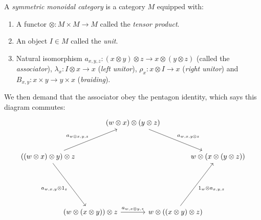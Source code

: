 \documentclass[TFM.tex]{subfiles}
\begin{document}
\begin{defi}
A \emph{symmetric monoidal category} is a category $M$ equipped with:
\begin{enumerate}[(1)]
\item A functor $\otimes: M\times M\to M$ called the \emph{tensor product}.
\item An object $I\in M$ called the \emph{unit}.
\item Natural isomorphism $a_{x,y,z} : (x \otimes y) \otimes z \to x \otimes (y \otimes z)$ (called the \emph{associator}), $\lambda_x : I \otimes x \to x$ (\emph{left unitor}), $\rho_x : x \otimes I \to x$ (\emph{right unitor}) and $B_{x,y}: x\times y\to y\times x$ (\emph{braiding}).
\end{enumerate}

We then demand that the associator obey the pentagon identity, which says this diagram commutes:
\[
\begin{tikzcd}[column sep=-25, row sep=30]
                                                                                                            &                                                                     & (w\otimes x)\otimes (y\otimes z) \arrow[rrd, "{a_{w,x,y\otimes z}}"] &                                                                         &                                \\
((w\otimes x)\otimes y)\otimes z \arrow[rru, "{a_{w\otimes x,y,z}}"] \arrow[rdd, "{a_{w,x,y}\otimes 1_z}"'] &                                                                     &                                                                      &                                                                         & w\otimes(x\otimes(y\otimes z)) \\
                                                                                                            &                                                                     &                                                                      &                                                                         &                                \\
                                                                                                            & (w\otimes (x\otimes y))\otimes z \arrow[rr, "{a_{w,x\otimes y,z}}"] &                                                                      & w\otimes ((x\otimes y)\otimes z) \arrow[ruu, "{1_w\otimes a_{x,y,z}}"'] &                               
\end{tikzcd}
\]
\end{defi}
\end{document}
